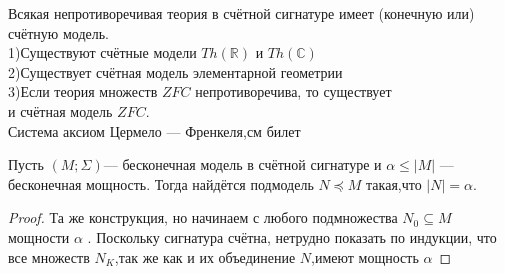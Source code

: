 \begin{corollary}
	Всякая непротиворечивая теория в счётной сигнатуре имеет (конечную или) счётную модель.\\
	1)Существуют счётные модели $Th(\mathbb{R})$ и $Th(\mathbb{C})$\\
	2)Существует счётная модель элементарной геометрии\\
	3)Если теория множеств $ZFC$ непротиворечива, то существует\\ и счётная модель $ZFC$.\\
	\textcolor{mygray}{Система аксиом Цермело — Френкеля,см билет}
\end{corollary}
\begin{theorem}
	Пусть $(M ;\Sigma)$— бесконечная модель в счётной сигнатуре и $\alpha \leq |M|$
	— бесконечная мощность. Тогда найдётся подмодель $N \preceq M$ такая,что $|N|=\alpha$.
\end{theorem}
\begin{proof}
	Та же конструкция, но начинаем с любого подмножества $N_0\subseteq M$
	мощности $\alpha$ . Поскольку сигнатура счётна, нетрудно показать по индукции, что все множеств $N_K$,так же
	как и их объединение $N$,имеют мощность $\alpha$ 
\end{proof}
